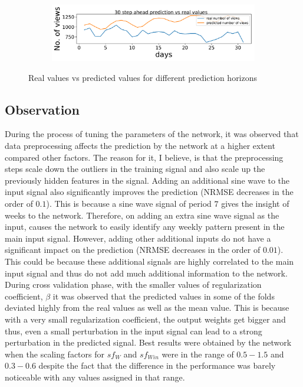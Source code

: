 \begin{figure}[]
      \begin{subfigure}[h]{1\textwidth}
          \includegraphics[width=\textwidth]{./results/images/30stepAhead}
      \end{subfigure}
	 
      \caption{Real values vs predicted values for different prediction horizons }\label{fig:realvspredicted}
  \end{figure}
  
 
 
 


 \subsection*{Observation}
 During the process of tuning the parameters of the network, it was observed that data preprocessing affects the prediction by the network at a higher extent compared other factors. The reason for it, I believe, is that the preprocessing steps scale down the outliers in the training signal and also scale up the previously hidden features in the signal. Adding an additional sine wave to the input signal also significantly improves the prediction (NRMSE decreases in the order of $0.1$).  This is because a sine wave signal of period $7$  gives the insight of weeks to the network. Therefore, on adding an extra sine wave signal as the input, causes the network to easily identify any weekly pattern present in the main input signal. However, adding other additional inputs do not have a significant impact on the prediction (NRMSE decreases in the order of $0.01$). This could be because these additional signals are highly correlated to the main input signal and thus do not add much additional information to the network. During cross validation phase, with the smaller values of regularization coefficient, $\beta$ it was observed that the predicted values in some of the folds deviated highly from the real values as well as the mean value. This is because with a very small regularization coefficient, the output weights get bigger and thus, even a small perturbation in the input signal can lead to a strong perturbation in the predicted signal. Best results were obtained by the network when the scaling factors for $sf_W$ and $sf_{Win}$ were in the range of $0.5 - 1.5$ and $0.3 - 0.6$ despite the fact that the difference in the performance was barely noticeable with any values assigned in that range. 
 
 
 